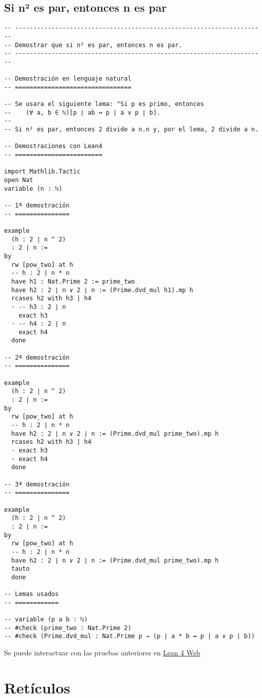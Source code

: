 \section{Si n² es par, entonces n es par}
\label{sec:org934ae90}
\begin{verbatim}
-- ---------------------------------------------------------------------
-- Demostrar que si n² es par, entonces n es par.
-- ---------------------------------------------------------------------

-- Demostración en lenguaje natural
-- ================================

-- Se usara el siguiente lema: "Si p es primo, entonces
--    (∀ a, b ∈ ℕ)[p ∣ ab ↔ p ∣ a ∨ p ∣ b].
--
-- Si n² es par, entonces 2 divide a n.n y, por el lema, 2 divide a n.

-- Demostraciones con Lean4
-- ========================

import Mathlib.Tactic
open Nat
variable (n : ℕ)

-- 1ª demostración
-- ===============

example
  (h : 2 ∣ n ^ 2)
  : 2 ∣ n :=
by
  rw [pow_two] at h
  -- h : 2 ∣ n * n
  have h1 : Nat.Prime 2 := prime_two
  have h2 : 2 ∣ n ∨ 2 ∣ n := (Prime.dvd_mul h1).mp h
  rcases h2 with h3 | h4
  · -- h3 : 2 ∣ n
    exact h3
  · -- h4 : 2 ∣ n
    exact h4
  done

-- 2ª demostración
-- ===============

example
  (h : 2 ∣ n ^ 2)
  : 2 ∣ n :=
by
  rw [pow_two] at h
  -- h : 2 ∣ n * n
  have h2 : 2 ∣ n ∨ 2 ∣ n := (Prime.dvd_mul prime_two).mp h
  rcases h2 with h3 | h4
  · exact h3
  · exact h4
  done

-- 3ª demostración
-- ===============

example
  (h : 2 ∣ n ^ 2)
  : 2 ∣ n :=
by
  rw [pow_two] at h
  -- h : 2 ∣ n * n
  have h2 : 2 ∣ n ∨ 2 ∣ n := (Prime.dvd_mul prime_two).mp h
  tauto
  done

-- Lemas usados
-- ============

-- variable (p a b : ℕ)
-- #check (prime_two : Nat.Prime 2)
-- #check (Prime.dvd_mul : Nat.Prime p → (p ∣ a * b ↔ p ∣ a ∨ p ∣ b))
\end{verbatim}
Se puede interactuar con las pruebas anteriores en \href{https://lean.math.hhu.de/\#url=https://raw.githubusercontent.com/jaalonso/Calculemus2/main/src/Par\_si\_cuadrado\_par.lean}{Lean 4 Web}

\chapter{Retículos}
\label{sec:orge00adae}


